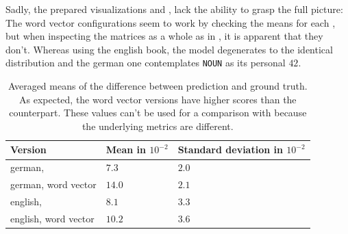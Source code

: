 Sadly, the prepared visualizations \ie \figref{\ref{fig: rsme plots}} and \tabref{\ref{tab: avg model versions and metrics}}, lack the ability to grasp the full picture: The word vector configurations seem to work by checking the means for each \postag{}, but when inspecting the matrices as a whole as in \figref{\ref{fig: avg model gt w2v de en}}, it is apparent that they don't. Whereas using the english book, the model degenerates to the identical distribution and the german one contemplates \texttt{NOUN} as its personal $ 42 $.
%
\begin{table}
	\centering
	\caption{Averaged means of the difference between prediction and ground truth. As expected, the word vector versions have higher scores than the \onehot{} counterpart. These values can't be used for a comparison with \tabref{\ref{tab: text model versions and metrics}} because the underlying metrics are different.}
	\begin{tabular}{lll}
		\toprule
		Version					& Mean in $ 10^{-2} $	& Standard deviation in $ 10^{-2} $ \\
		\midrule
		german, \onehot{} 		& $ 7.3 $				& $ 2.0 $ \\%
		german, word vector		& $ 14.0 $				& $ 2.1 $ \\%
		english, \onehot{}		& $ 8.1 $				& $ 3.3 $ \\%
		english, word vector	& $ 10.2 $				& $ 3.6 $ \\%
		\bottomrule
	\end{tabular}
	\label{tab: avg model versions and metrics}
\end{table}
%
